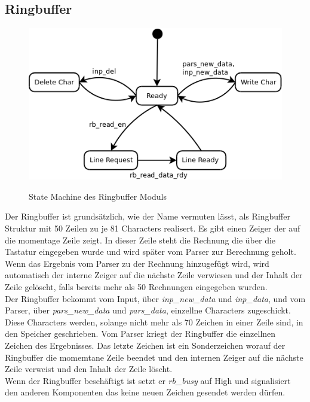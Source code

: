 \subsection{Ringbuffer}

\begin{figure}[!ht]
 \caption{State Machine des Ringbuffer Moduls}
 \centering
 \includegraphics[scale=0.55]{pics/Ringbuffer.png}
 \label{fig:Modules}
\end{figure}

Der Ringbuffer ist grundsätzlich, wie der Name vermuten lässt, als Ringbuffer Struktur mit 50 Zeilen
zu je 81 Characters realisert. Es gibt einen Zeiger der auf die momentage Zeile zeigt. In dieser Zeile
steht die Rechnung die über die Tastatur eingegeben wurde und wird später vom Parser zur Berechnung
geholt. Wenn das Ergebnis vom Parser zu der Rechnung hinzugefügt wird, wird automatisch der interne Zeiger
auf die nächste Zeile verwiesen und der Inhalt der Zeile gelöscht, falls bereits mehr als 50 Rechnungen
eingegeben wurden.\\
Der Ringbuffer bekommt vom Input, über \textit{inp\_new\_data} und \textit{inp\_data}, und vom Parser, 
über \textit{pars\_new\_data} und \textit{pars\_data}, einzellne Characters zugeschickt.\\
Diese Characters werden, solange nicht mehr als 70 Zeichen in einer Zeile sind, in den Speicher geschrieben.
Vom Parser kriegt der Ringbuffer die einzellnen Zeichen des Ergebnisses. Das letzte Zeichen ist ein
Sonderzeichen worauf der Ringbuffer die momemtane Zeile beendet und den internen Zeiger auf die nächste
Zeile verweist und den Inhalt der Zeile löscht.\\
Wenn der Ringbuffer beschäftigt ist setzt er \textit{rb\_busy} auf High und signalisiert den anderen
Komponenten das keine neuen Zeichen gesendet werden dürfen.


